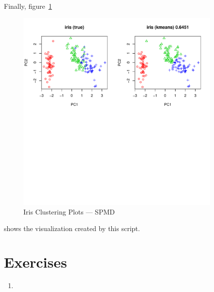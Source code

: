 Finally, figure~\ref{fig:iris_cluster_spmd}
\begin{figure}[h!bt]
  \centering
  \includegraphics[width=4in]{pbdDEMO-include/pics/dmat_plot.pdf}
  \caption{Iris Clustering Plots --- SPMD}
  \label{fig:iris_cluster_spmd}
\end{figure}
shows the visualization created by this script.




















\section{Exercises}
\label{sec:pmclust_exercise}

\begin{enumerate}[label=\thechapter-\arabic*]
\item

\end{enumerate}

